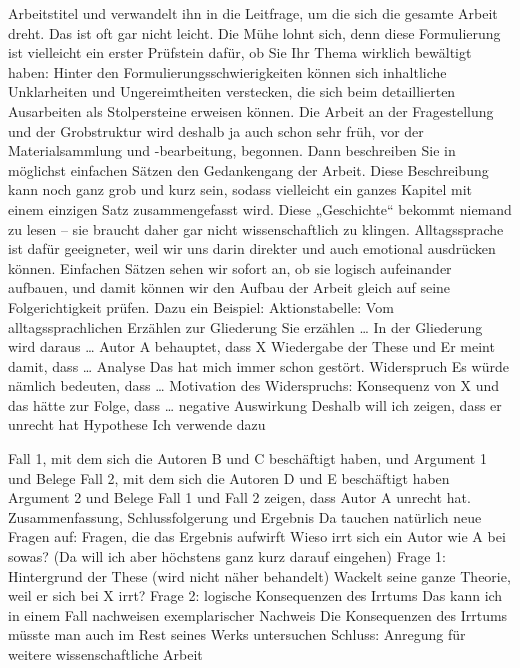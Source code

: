\documentclass[]{book}
\theoremstyle{definition}
\theoremstyle{definition}
\theoremstyle{definition}
\theoremstyle{remark}
\begin{document}
\begin{itemize}
  Arbeitstitel und verwandelt ihn in die Leitfrage, um die sich die
  gesamte Arbeit dreht. Das ist oft gar nicht leicht. Die Mühe lohnt
  sich, denn diese Formulierung ist vielleicht ein erster Prüfstein
  dafür, ob Sie Ihr Thema wirklich bewältigt haben: Hinter den
  Formulierungsschwierigkeiten können sich inhaltliche Unklarheiten und
  Ungereimtheiten verstecken, die sich beim detaillierten Ausarbeiten
  als Stolpersteine erweisen können. Die Arbeit an der Fragestellung und
  der Grobstruktur wird deshalb ja auch schon sehr früh, vor der
  Materialsammlung und -bearbeitung, begonnen. Dann beschreiben Sie in
  möglichst einfachen Sätzen den Gedankengang der Arbeit. Diese
  Beschreibung kann noch ganz grob und kurz sein, sodass vielleicht ein
  ganzes Kapitel mit einem einzigen Satz zusammengefasst wird. Diese
  „Geschichte`` bekommt niemand zu lesen -- sie braucht daher gar nicht
  wissenschaftlich zu klingen. Alltagssprache ist dafür geeigneter, weil
  wir uns darin direkter und auch emotional ausdrücken können. Einfachen
  Sätzen sehen wir sofort an, ob sie logisch aufeinander aufbauen, und
  damit können wir den Aufbau der Arbeit gleich auf seine
  Folgerichtigkeit prüfen. Dazu ein Beispiel: Aktionstabelle: Vom
  alltagssprachlichen Erzählen zur Gliederung Sie erzählen \ldots{} In
  der Gliederung wird daraus \ldots{} Autor A behauptet, dass X
  Wiedergabe der These und Er meint damit, dass \ldots{} Analyse Das hat
  mich immer schon gestört. Widerspruch Es würde nämlich bedeuten, dass
  \ldots{} Motivation des Widerspruchs: Konsequenz von X und das hätte
  zur Folge, dass \ldots{} negative Auswirkung Deshalb will ich zeigen,
  dass er unrecht hat Hypothese Ich verwende dazu
\end{itemize}

Fall 1, mit dem sich die Autoren B und C beschäftigt haben, und Argument
1 und Belege Fall 2, mit dem sich die Autoren D und E beschäftigt haben
Argument 2 und Belege Fall 1 und Fall 2 zeigen, dass Autor A unrecht
hat. Zusammenfassung, Schlussfolgerung und Ergebnis Da tauchen natürlich
neue Fragen auf: Fragen, die das Ergebnis aufwirft Wieso irrt sich ein
Autor wie A bei sowas? (Da will ich aber höchstens ganz kurz darauf
eingehen) Frage 1: Hintergrund der These (wird nicht näher behandelt)
Wackelt seine ganze Theorie, weil er sich bei X irrt? Frage 2: logische
Konsequenzen des Irrtums Das kann ich in einem Fall nachweisen
exemplarischer Nachweis Die Konsequenzen des Irrtums müsste man auch im
Rest seines Werks untersuchen Schluss: Anregung für weitere
wissenschaftliche Arbeit
\end{document}
